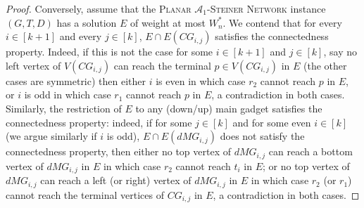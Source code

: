 \documentclass[a4paper,11pt]{article}
\theoremstyle{plain}
\newtheorem{identification rule}{Identification Rule}
\theoremstyle{definition}
\theoremstyle{remark}
\newcommand{\oldC}{\mathcal{A}}
\begin{document}
\begin{proof}
Conversely, assume that the \textsc{Planar $\oldC_1$-Steiner Network} instance $(G,T,D)$ has a solution $E$ of weight at most $W_n^*$. We contend that for every $i \in [k+1]$ and every $j \in [k]$, $E \cap E(CG_{i,j})$ satisfies the connectedness property. Indeed, if this is not the case for some $i \in [k+1]$ and $j\in [k]$, say no left vertex of $V(CG_{i,j})$ can reach the terminal $p \in V(CG_{i,j})$ in $E$ (the other cases are symmetric) then either $i$ is even in which case $r_2$ cannot reach $p$ in $E$, or $i$ is odd in which case $r_1$ cannot reach $p$ in $E$, a contradiction in both cases. Similarly, the restriction of $E$ to any (down/up) main gadget satisfies the connectedness property: indeed, if for some $j \in [k]$ and for some even $i \in [k]$ (we argue similarly if $i$ is odd), $E \cap E(dMG_{i,j})$ does not satisfy the connectedness property, then either no top vertex of $dMG_{i,j}$ can reach a bottom vertex of $dMG_{i,j}$ in $E$ in which case $r_2$ cannot reach $t_i$ in $E$; or no top vertex of $dMG_{i,j}$ can reach a left (or right) vertex of $dMG_{i,j}$ in $E$ in which case $r_2$ (or $r_1$) cannot reach the terminal vertices of $CG_{i,j}$ in $E$, a contradiction in both cases.


\end{proof}
\end{document}
